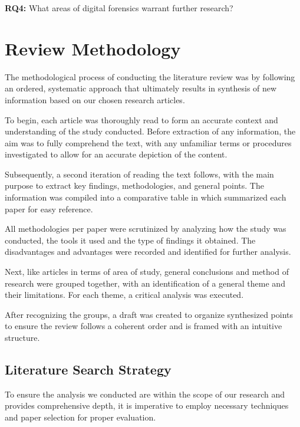 \documentclass[12pt,a4paper]{article}
\begin{document}
\begin{justify}
\vspace{0.2cm}

\textbf{RQ4:} What areas of digital forensics warrant further research?



\section{Review Methodology}

The methodological process of conducting the literature review was by following an ordered, systematic approach that ultimately results in synthesis of new information based on our chosen research articles. 

To begin, each article was thoroughly read to form an accurate context and understanding of the study conducted. Before extraction of any information, the aim was to fully comprehend the text, with any unfamiliar terms or procedures investigated to allow for an accurate depiction of the content. 

Subsequently, a second iteration of reading the text follows, with the main purpose to extract key findings, methodologies, and general points. The information was compiled into a comparative table in which summarized  each paper for easy reference. 

All methodologies per paper were scrutinized by analyzing how the study was conducted, the tools it used and the type of findings it obtained. The disadvantages and advantages were recorded and identified for further analysis.

Next, like articles in terms of area of study, general conclusions and method of research were grouped together, with an identification of a general theme and their limitations. For each theme, a critical analysis was executed.

After recognizing the groups, a draft was created to organize synthesized points to ensure the review follows a coherent order and is framed with an intuitive structure.


\subsection{Literature Search Strategy}

To ensure the analysis we conducted are within the scope of our research and provides comprehensive depth, it is imperative to employ necessary techniques and paper selection for proper evaluation.


\end{justify}
\end{document}
